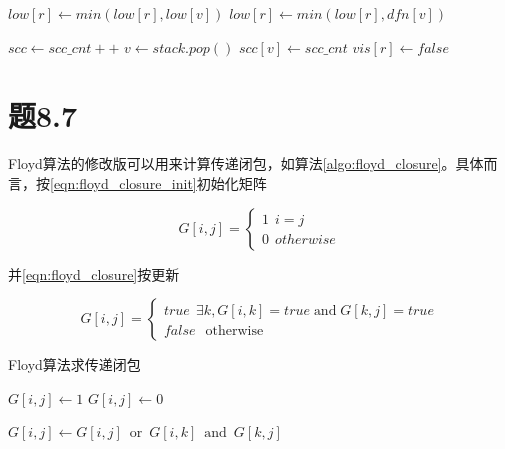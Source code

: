 \documentclass[a4paper,twoside]{article}
\begin{document}
\begin{spacing}{1.2}
\begin{algorithm}
\begin{algorithmic}[1]
				\State $low[r] \gets min(low[r],low[v])$
				\State $low[r] \gets min(low[r],dfn[v])$
			\EndIf
		\EndFor

			\State $scc\gets scc\_cnt++$
				\State $v\gets stack.pop()$
				\State $scc[v]\gets scc\_cnt$
				\State $vis[r]\gets false$
			\EndWhile
		\EndIf
		\EndProcedure
	\end{algorithmic}
\end{algorithm}	

\section{题8.7}

Floyd算法的修改版可以用来计算传递闭包，如算法\ref{algo:floyd_closure}。具体而言，按\eqref{eqn:floyd_closure_init}初始化矩阵

\begin{equation}
	\label{eqn:floyd_closure_init}
	G[i,j]=\begin{cases}
		1 \ \ i=j \\
		0 \ \ otherwise
	\end{cases}
\end{equation}

并\eqref{eqn:floyd_closure}按更新

\begin{equation}
	\label{eqn:floyd_closure}
	G[i,j]=\begin{cases}
		true \ \ \exists k, G[i,k]=true \mathop{and} G[k,j]=true \\
		false \ \ \mathop{otherwise}
	\end{cases}
\end{equation}


\begin{algorithm}
	\caption{Floyd算法求传递闭包}
	\label{algo:floyd_closure}
	\begin{algorithmic}[1]		
		
					\State $G[i,j]\gets 1$
				\Else
					\State $G[i,j]\gets 0$
				\EndIf
			\EndFor
		\EndFor

					\State $G[i,j]\gets G[i,j] \ \mathop{or} \ G[i,k] \ \mathop{and} \ G[k,j]$
				\EndFor
			\EndFor
		\EndFor

		\EndProcedure
	\end{algorithmic}
\end{algorithm}


\end{spacing}
\end{document}
